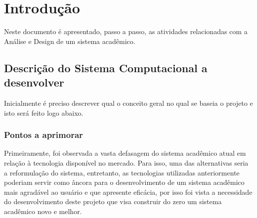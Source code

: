 
\chapter{Introdução}

    \begin{comment}
        Prof. Dr. Ausberto S. Castro Vera
        UENF - CCT - LCMAT - Curso de Ciência da Computação
        Campos, RJ,  2022
        Disciplina: Análise e Projeto de Sistemas
        Aluno: João Vítor Fernandes Dias
    \end{comment}


    Neste documento é apresentado, passo a passo,  as atividades relacionadas com a Análise e Design de um sistema acadêmico.

    \section{Descrição do Sistema Computacional a desenvolver}
        Inicialmente é preciso descrever qual o conceito geral no qual se baseia o projeto e isto será feito logo abaixo.
        
        \subsection{Pontos a aprimorar}
            Primeiramente, foi observada a vasta defasagem do sistema acadêmico atual em relação à tecnologia disponível no mercado. Para isso, uma das alternativas seria a reformulação do sistema, entretanto, as tecnologias utilizadas anteriormente poderiam servir como âncora para o desenvolvimento de um sistema acadêmico mais agradável ao usuário e que apresente eficácia, por isso foi vista a necessidade do desenvolvimento deste projeto que visa construir do zero um sistema acadêmico novo e melhor.
            
